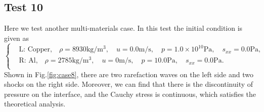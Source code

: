 \documentclass[review]{elsarticle}
\numberwithin{equation}{section}
\numberwithin{table}{section}
\begin{document}
\subsection{Test 10}
Here we test another multi-materials case. In this test the initial condition is given as
\begin{equation}
 \left\{ \begin{aligned}
	 &	 \text{L: Copper,}\quad  \rho = 8930 \text{kg}/\text{m}^3, \quad  u = 0.0\text{m}/\text{s}, \quad  p = 1.0\times 10^{10}\text{Pa}, \quad  s_{xx}=0.0 \text{Pa},\\
	 &	 \text{R: Al,}\quad  \rho = 2785 \text{kg}/\text{m}^3, \quad  u = 0\text{m}/\text{s}, \quad  p = 10.0 \text{Pa}, \quad  s_{xx}=0.0 \text{Pa}.\\
   \end{aligned}
 \right.
\end{equation}
Shown in Fig.\ref{fig:case8}, there are two rarefaction waves on the left side and two shocks on the right side. Moreover, we can find that there is the discontinuity of pressure on the interface, and the Cauchy stress is continuous, which  satisfies the theoretical analysis.
\end{document}
